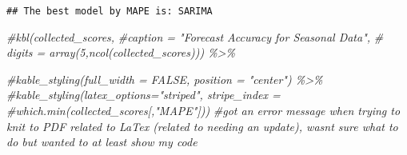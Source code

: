 \documentclass[
]{article}
\newenvironment{Shaded}{\begin{snugshade}}{\end{snugshade}}
\newcommand{\CommentTok}[1]{\textcolor[rgb]{0.56,0.35,0.01}{\textit{#1}}}
\begin{document}
\begin{verbatim}
## The best model by MAPE is: SARIMA
\end{verbatim}

\begin{Shaded}
\begin{Highlighting}[]
\CommentTok{\#kbl(collected\_scores, }
      \CommentTok{\#caption = "Forecast Accuracy for Seasonal Data",}
     \CommentTok{\# digits = array(5,ncol(collected\_scores))) \%\textgreater{}\%}
  
\CommentTok{\#kable\_styling(full\_width = FALSE, position = "center") \%\textgreater{}\%}
  \CommentTok{\#kable\_styling(latex\_options="striped", stripe\_index = \#which.min(collected\_scores[,"MAPE"]))}
\CommentTok{\#got an error message when trying to knit to PDF related to LaTex (related to needing an update), wasn\textquotesingle{}t sure what to do but wanted to at least show my code}
\end{Highlighting}
\end{Shaded}
\end{document}
